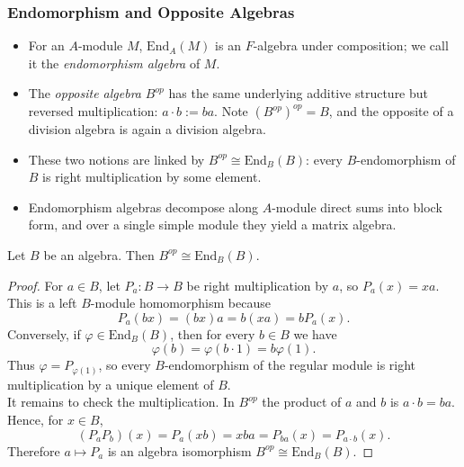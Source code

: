 \documentclass[../Odyssey_Project.tex]{subfiles}
\begin{document}
\subsubsection*{Endomorphism and Opposite Algebras}
\begin{itemize}
    \item For an $A$-module $M$, $\mathrm{End}_A(M)$ is an $F$-algebra under composition; we call it the \emph{endomorphism algebra} of $M$.
    \item The \emph{opposite algebra} $B^{op}$ has the same underlying additive structure but reversed multiplication: $a \cdot b := ba$. Note $(B^{op})^{op} = B$, and the opposite of a division algebra is again a division algebra.
    \item These two notions are linked by $B^{op} \cong \mathrm{End}_B(B)$: every $B$-endomorphism of $B$ is right multiplication by some element.
    \item Endomorphism algebras decompose along $A$-module direct sums into block form, and over a single simple module they yield a matrix algebra.
\end{itemize}

\begin{lemma}
\label{lem:13.11}
Let $B$ be an algebra. Then $B^{op} \cong \mathrm{End}_B(B)$.
\end{lemma}
\begin{proof}
    For $a \in B$, let $P_a \colon B \to B$ be right multiplication by $a$, so $P_a(x) = xa$. This is a left $B$-module homomorphism because
    \[
        P_a(bx) = (bx)a = b(xa) = bP_a(x).
    \]
    Conversely, if $\varphi \in \mathrm{End}_B(B)$, then for every $b \in B$ we have
    \[
        \varphi(b) = \varphi(b \cdot 1) = b\varphi(1).
    \]
    Thus $\varphi = P_{\varphi(1)}$, so every $B$-endomorphism of the regular module is right multiplication by a unique element of $B$.\\
    It remains to check the multiplication. In $B^{op}$ the product of $a$ and $b$ is $a \cdot b = ba$. Hence, for $x \in B$,
    \[
        (P_aP_b)(x) = P_a(xb) = xba = P_{ba}(x) = P_{a \cdot b}(x).
    \]
    Therefore $a \mapsto P_a$ is an algebra isomorphism $B^{op} \cong \mathrm{End}_B(B)$.
\end{proof}
\end{document}
